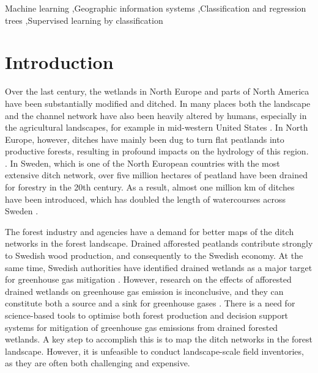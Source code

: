 \documentclass[11pt, review]{elsarticle} %
\begin{document}
\begin{frontmatter}
\begin{keyword}
{\footnotesize
Machine learning \sep Geographic information systems \sep Classification and regression trees \sep Supervised learning by classification}
\end{keyword}

\end{frontmatter}

\newpage
\section{Introduction}\label{introduction}

Over the last century, the wetlands in North Europe and parts of North America have been substantially modified and ditched. In many places both the landscape and the channel network have also been heavily altered  by humans, especially in the agricultural landscapes, for example in mid-western United States \citep{passalacqua}. In North Europe, however, ditches have mainly been dug to turn flat peatlands into productive forests, resulting in profound impacts on the hydrology of this region. \citep{peatlands}. In Sweden, which is one of the North European countries with the most extensive ditch network, over five million hectares of peatland have been drained for forestry in the 20th century.  As a result, almost one million km of ditches have been introduced, which has doubled the length of watercourses across Sweden  \citep{hasselquist}.

The forest industry and agencies have a demand for better maps of the ditch networks in the forest landscape. Drained afforested peatlands contribute strongly to Swedish wood production, and consequently to the Swedish economy. At the same time, Swedish authorities have identified drained wetlands as a major target for greenhouse gas mitigation \citep{greenhouse_skogsstyrelsen, greenhouse_jordbruksverket}. However, research on the effects of afforested drained wetlands on greenhouse gas emission is inconclusive, and they can constitute both a source and a sink for greenhouse gases \citep{greenhouse_yes, greenhouse_no}. There is a need for science-based tools to optimise both forest production and decision support systems for mitigation of greenhouse gas emissions from drained forested wetlands. A key step to accomplish this is to map the ditch networks in the forest landscape. However, it is unfeasible to conduct landscape-scale field inventories, as they are often both challenging and expensive.
\end{document}
